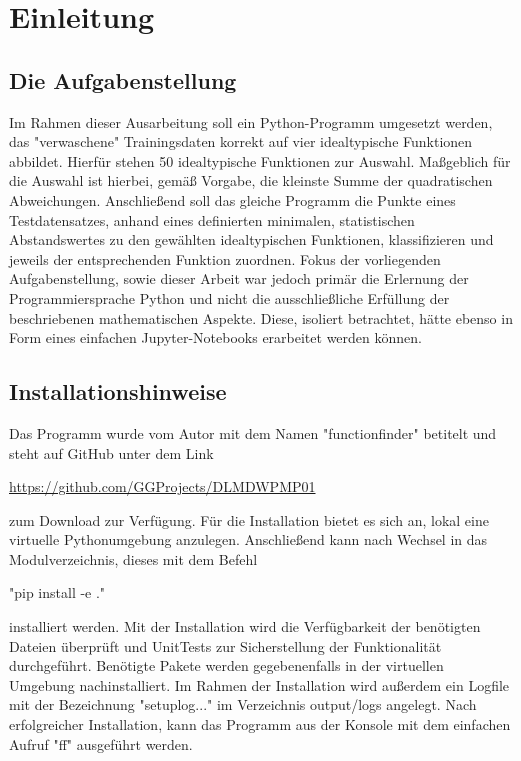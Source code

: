 \chapter{Einleitung}

\section{Die Aufgabenstellung}

Im Rahmen dieser Ausarbeitung soll ein Python-Programm umgesetzt werden, das "verwaschene" Trainingsdaten korrekt auf vier idealtypische Funktionen abbildet. Hierfür stehen 50 idealtypische Funktionen zur Auswahl. Maßgeblich für die Auswahl ist hierbei, gemäß Vorgabe, die kleinste Summe der quadratischen Abweichungen.
Anschließend soll das gleiche Programm die Punkte eines Testdatensatzes, anhand eines definierten minimalen, statistischen Abstandswertes zu den gewählten idealtypischen Funktionen, klassifizieren und jeweils der entsprechenden Funktion zuordnen.
Fokus der vorliegenden Aufgabenstellung, sowie dieser Arbeit war jedoch primär die Erlernung der Programmiersprache Python und nicht die ausschließliche Erfüllung der beschriebenen mathematischen Aspekte. Diese, isoliert betrachtet, hätte ebenso in Form eines einfachen Jupyter-Notebooks erarbeitet werden können.

\section{Installationshinweise}

Das Programm wurde vom Autor mit dem Namen "functionfinder" betitelt und steht auf GitHub unter dem Link \begin{center}\url{https://github.com/GGProjects/DLMDWPMP01}\end{center} zum Download zur Verfügung.
Für die Installation bietet es sich an, lokal eine virtuelle Pythonumgebung anzulegen. Anschließend kann nach Wechsel in das Modulverzeichnis, dieses mit dem Befehl
\begin{center}"pip install -e ."\end{center}
installiert werden.
Mit der Installation wird die Verfügbarkeit der benötigten Dateien überprüft und UnitTests zur Sicherstellung der Funktionalität durchgeführt. Benötigte Pakete werden gegebenenfalls in der virtuellen Umgebung nachinstalliert. Im Rahmen der Installation wird außerdem ein Logfile mit der Bezeichnung "setuplog..." im Verzeichnis output/logs angelegt.
Nach erfolgreicher Installation, kann das Programm aus der Konsole mit dem einfachen Aufruf "ff" ausgeführt werden.

